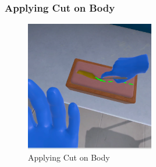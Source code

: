 \subsubsection{Applying Cut on Body}
\begin{figure}[h]
	\centering
	\includegraphics[width=0.5\textwidth, height=0.3\textheight]{Images/Applying Cut on Body.png}
	\caption{Applying Cut on Body}
	\label{fig:Applying Cut on Body}
\end{figure}
\newpage
